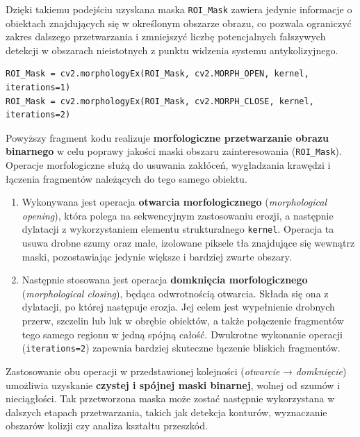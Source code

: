 \documentclass[magisterska]{pracadypl}
\begin{document}
Dzięki takiemu podejściu uzyskana maska \texttt{ROI\_Mask} zawiera jedynie informacje o obiektach znajdujących się w określonym obszarze obrazu, co pozwala ograniczyć zakres dalszego przetwarzania i zmniejszyć liczbę potencjalnych fałszywych detekcji w obszarach nieistotnych z punktu widzenia systemu antykolizyjnego.

\begin{lstlisting}[style=mypython]
ROI_Mask = cv2.morphologyEx(ROI_Mask, cv2.MORPH_OPEN, kernel, iterations=1)
ROI_Mask = cv2.morphologyEx(ROI_Mask, cv2.MORPH_CLOSE, kernel, iterations=2)
\end{lstlisting}

Powyższy fragment kodu realizuje \textbf{morfologiczne przetwarzanie obrazu binarnego} w celu poprawy jakości maski obszaru zainteresowania (\texttt{ROI\_Mask}). Operacje morfologiczne służą do usuwania zakłóceń, wygładzania krawędzi i łączenia fragmentów należących do tego samego obiektu.

\begin{enumerate}
    \item Wykonywana jest operacja \textbf{otwarcia morfologicznego} (\textit{morphological opening}), która polega na sekwencyjnym zastosowaniu erozji, a następnie dylatacji z wykorzystaniem elementu strukturalnego \texttt{kernel}. 
    Operacja ta usuwa drobne szumy oraz małe, izolowane piksele tła znajdujące się wewnątrz maski, pozostawiając jedynie większe i bardziej zwarte obszary.

    \item Następnie stosowana jest operacja \textbf{domknięcia morfologicznego} (\textit{morphological closing}), będąca odwrotnością otwarcia. Składa się ona z dylatacji, po której następuje erozja. 
    Jej celem jest wypełnienie drobnych przerw, szczelin lub luk w obrębie obiektów, a także połączenie fragmentów tego samego regionu w jedną spójną całość. 
    Dwukrotne wykonanie operacji (\texttt{iterations=2}) zapewnia bardziej skuteczne łączenie bliskich fragmentów.

\end{enumerate}

Zastosowanie obu operacji w przedstawionej kolejności (\textit{otwarcie} → \textit{domknięcie}) umożliwia uzyskanie \textbf{czystej i spójnej maski binarnej}, wolnej od szumów i nieciągłości. Tak przetworzona maska może zostać następnie wykorzystana w dalszych etapach przetwarzania, takich jak detekcja konturów, wyznaczanie obszarów kolizji czy analiza kształtu przeszkód.
\end{document}
